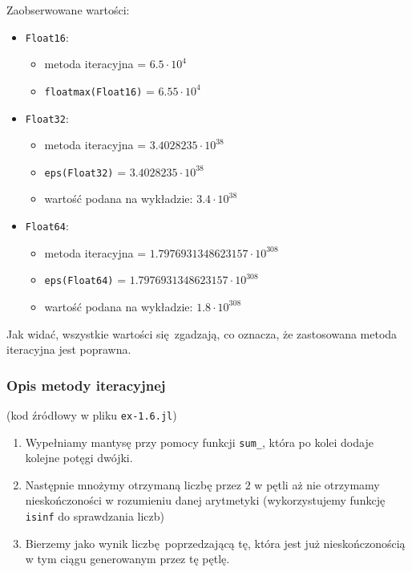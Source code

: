 \documentclass[10pt]{article}
\begin{document}
Zaobserwowane wartości:
\begin{itemize}
    \item \texttt{Float16}:
    \begin{itemize}
        \item metoda iteracyjna = $6.5 \cdot 10^{4}$
        \item \texttt{floatmax(Float16)} = $6.55 \cdot 10^{4}$
    \end{itemize}
    \item \texttt{Float32}:
    \begin{itemize}
        \item metoda iteracyjna = $3.4028235 \cdot 10^{38}$
        \item \texttt{eps(Float32)} = $3.4028235 \cdot 10^{38}$
        \item wartość podana na wykładzie: $3.4 \cdot 10^{38}$
    \end{itemize}
    \item \texttt{Float64}:
    \begin{itemize}
        \item metoda iteracyjna = $1.7976931348623157 \cdot 10^{308}$
        \item \texttt{eps(Float64)} = $1.7976931348623157 \cdot 10^{308}$
        \item wartość podana na wykładzie: $1.8 \cdot 10^{308}$
    \end{itemize}
\end{itemize}

Jak widać, wszystkie wartości się zgadzają, co oznacza, że zastosowana metoda iteracyjna jest poprawna.

\subsubsection{Opis metody iteracyjnej}
(kod źródłowy w pliku \texttt{ex-1.6.jl})
\begin{enumerate}
    \item Wypełniamy mantysę przy pomocy funkcji \texttt{sum\_}, która po kolei dodaje kolejne potęgi dwójki.
    \item Następnie mnożymy otrzymaną liczbę przez $2$ w pętli aż nie otrzymamy nieskończoności w rozumieniu danej arytmetyki (wykorzystujemy funkcję \texttt{isinf} do sprawdzania liczb)
    \item Bierzemy jako wynik liczbę poprzedzającą tę, która jest już nieskończonością w tym ciągu generowanym przez tę pętlę.
\end{enumerate}
\end{document}
